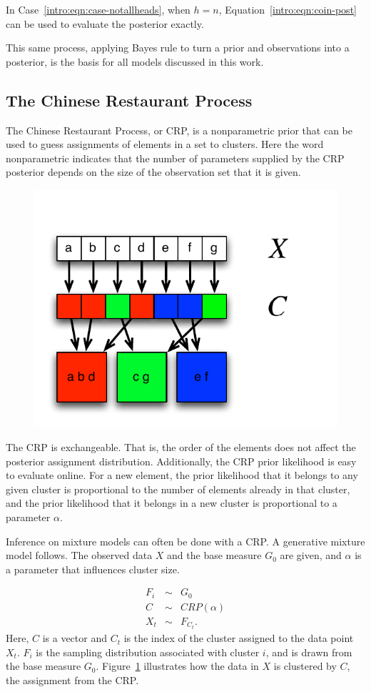 In Case~\ref{intro:eqn:case-notallheads}, when $h=n$, Equation~\ref{intro:eqn:coin-post} can be used to evaluate the posterior exactly.

This same process, applying Bayes rule to turn a prior and observations into a posterior, is the basis for all models discussed in this work.

\subsection{The Chinese Restaurant Process}

The Chinese Restaurant Process, or CRP, is a nonparametric prior that can be used to guess assignments of elements in a set to clusters. Here the word nonparametric indicates that the number of parameters supplied by the CRP posterior depends on the size of the observation set that it is given.

\begin{figure}[t]
\begin{center}
\includegraphics[width=0.4\linewidth]{crp-mixture.pdf}
\caption{}
\label{intro:crp-mixture}
\end{center}
\end{figure}



The CRP is exchangeable. That is, the order of the elements does not affect the posterior assignment distribution. Additionally, the CRP prior likelihood is easy to evaluate online. For a new element, the prior likelihood that it belongs to any given cluster is proportional to the number of elements already in that cluster, and the prior likelihood that it belongs in a new cluster is proportional to a parameter $\alpha$.

Inference on mixture models can often be done with a CRP. A generative mixture model follows. The observed data $X$ and the base measure $G_0$ are given, and $\alpha$ is a parameter that influences cluster size.

\begin{eqnarray}
F_i&\sim&G_0\\
C&\sim&CRP(\alpha)\\
X_t&\sim&F_{C_t}.
\end{eqnarray}
Here, $C$ is a vector and $C_t$ is the index of the cluster assigned to the data point $X_t$. $F_i$ is the sampling distribution associated with cluster $i$, and is drawn from the base measure $G_0$. Figure~\ref{intro:crp-mixture} illustrates how the data in $X$ is clustered by $C$, the assignment from the CRP.

